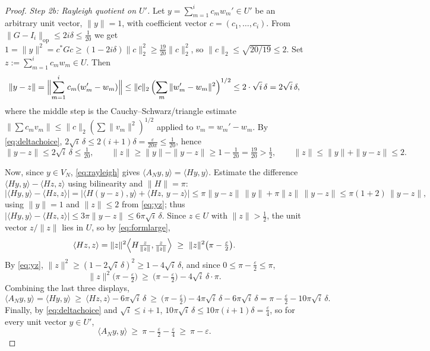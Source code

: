 \documentclass[12pt]{article}
\theoremstyle{remark}
\begin{document}
\begin{proof}
\smallskip
\noindent\emph{Step 2b: Rayleigh quotient on $U'$.} Let $y=\sum_{m=1}^i c_m w_m'\in U'$ be an
arbitrary unit vector, $\|y\|=1$, with coefficient vector $c=(c_1,\dots,c_i)$. From
$\|G-I_i\|_{\mathrm{op}}\le2i\delta\le\frac1{20}$ we get
$1=\|y\|^2=c^*Gc\ge(1-2i\delta)\|c\|_2^2\ge\tfrac{19}{20}\|c\|_2^2$, so
$\|c\|_2\le\sqrt{20/19}\le2$. Set $z:=\sum_{m=1}^i c_m w_m\in U$. Then
\[
\|y-z\|=\Bigl\|\sum_{m=1}^i c_m(w_m'-w_m)\Bigr\|\le\|c\|_2\,\Bigl(\sum_{m}\|w_m'-w_m\|^2\Bigr)^{1/2}
\le2\cdot\sqrt{i}\,\delta=2\sqrt i\,\delta ,
\]
where the middle step is the Cauchy--Schwarz/triangle estimate
$\|\sum c_m v_m\|\le\|c\|_2(\sum\|v_m\|^2)^{1/2}$ applied to $v_m=w_m'-w_m$. By
\eqref{eq:deltachoice}, $2\sqrt i\,\delta\le2(i+1)\delta=\frac{\varepsilon}{20\pi}\le\frac1{20}$,
hence
\begin{equation}\label{eq:yz}
\|y-z\|\le2\sqrt i\,\delta\le\tfrac1{20},\qquad
\|z\|\ge\|y\|-\|y-z\|\ge1-\tfrac1{20}=\tfrac{19}{20}>\tfrac12 ,\qquad
\|z\|\le\|y\|+\|y-z\|\le2 .
\end{equation}

Now, since $y\in V_N$, \eqref{eq:rayleigh} gives $\langle A_Ny,y\rangle=\langle Hy,y\rangle$.
Estimate the difference $\langle Hy,y\rangle-\langle Hz,z\rangle$ using bilinearity and
$\|H\|=\pi$:
\[
\bigl|\langle Hy,y\rangle-\langle Hz,z\rangle\bigr|
=\bigl|\langle H(y-z),y\rangle+\langle Hz,\,y-z\rangle\bigr|
\le\pi\|y-z\|\,\|y\|+\pi\|z\|\,\|y-z\|
\le\pi(1+2)\,\|y-z\| ,
\]
using $\|y\|=1$ and $\|z\|\le2$ from \eqref{eq:yz}; thus
$\bigl|\langle Hy,y\rangle-\langle Hz,z\rangle\bigr|\le3\pi\|y-z\|\le6\pi\sqrt i\,\delta$.
Since $z\in U$ with $\|z\|>\tfrac12$, the unit vector $z/\|z\|$ lies in $U$, so by
\eqref{eq:formlarge},
\[
\langle Hz,z\rangle=\|z\|^2\Bigl\langle H\tfrac{z}{\|z\|},\tfrac{z}{\|z\|}\Bigr\rangle
\ \ge\ \|z\|^2\bigl(\pi-\tfrac\varepsilon2\bigr) .
\]
By \eqref{eq:yz}, $\|z\|^2\ge(1-2\sqrt i\,\delta)^2\ge1-4\sqrt i\,\delta$, and since
$0\le\pi-\tfrac\varepsilon2\le\pi$,
\[
\|z\|^2\bigl(\pi-\tfrac\varepsilon2\bigr)\ \ge\ \bigl(\pi-\tfrac\varepsilon2\bigr)-4\sqrt i\,\delta\cdot\pi .
\]
Combining the last three displays,
\[
\langle A_Ny,y\rangle=\langle Hy,y\rangle
\ \ge\ \langle Hz,z\rangle-6\pi\sqrt i\,\delta
\ \ge\ \bigl(\pi-\tfrac\varepsilon2\bigr)-4\pi\sqrt i\,\delta-6\pi\sqrt i\,\delta
=\pi-\tfrac\varepsilon2-10\pi\sqrt i\,\delta .
\]
Finally, by \eqref{eq:deltachoice} and $\sqrt i\le i+1$,
$10\pi\sqrt i\,\delta\le10\pi(i+1)\delta=\tfrac{\varepsilon}{4}$, so for every unit vector
$y\in U'$,
\begin{equation}\label{eq:Uprimeform}
\langle A_Ny,y\rangle\ \ge\ \pi-\tfrac\varepsilon2-\tfrac\varepsilon4\ \ge\ \pi-\varepsilon .
\end{equation}


\end{proof}
\end{document}
